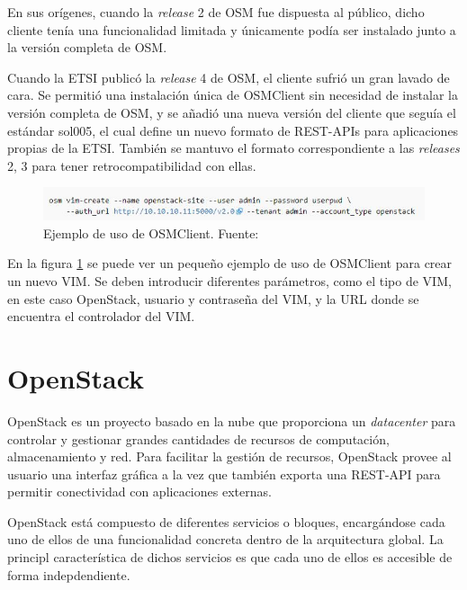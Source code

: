 En sus orígenes, cuando la \textit{release} 2 de \ac{OSM} fue dispuesta al público, dicho cliente tenía una funcionalidad limitada y únicamente podía ser instalado junto a la versión completa de \ac{OSM}.

Cuando la \ac{ETSI} publicó la \textit{release} 4 de \ac{OSM}, el cliente sufrió un gran lavado de cara. Se permitió una instalación única de OSMClient sin necesidad de instalar la versión completa de \ac{OSM}, y se añadió una nueva versión del cliente que seguía el estándar sol005\cite{sol005item}, el cual define un nuevo formato de REST-\acp{API} para aplicaciones propias de la \ac{ETSI}. También se mantuvo el formato correspondiente a las \textit{releases} 2, 3 para tener retrocompatibilidad con ellas.

\begin{figure}[!ht]
	\centering
	\includegraphics[width=0.95\linewidth]{imagenes/osmclientpython_example}
	\caption{Ejemplo de uso de OSMClient. Fuente:\cite{osmrel5bib}}
	\label{fig:osmclientpythonexample}
\end{figure}

En la figura \ref{fig:osmclientpythonexample} se puede ver un pequeño ejemplo de uso de OSMClient para crear un nuevo \ac{VIM}. Se deben introducir diferentes parámetros, como el tipo de \ac{VIM}, en este caso OpenStack, usuario y contraseña del \ac{VIM}, y la \ac{URL} donde se encuentra el controlador del \ac{VIM}.

\section{OpenStack}
\label{sec:openstack}

OpenStack\cite{openstackbib} es un proyecto basado en la nube que proporciona un \textit{datacenter} para controlar y gestionar grandes cantidades de recursos de computación, almacenamiento y red. Para facilitar la gestión de recursos, OpenStack provee al usuario una interfaz gráfica a la vez que también exporta una \ac{REST}-\ac{API} para permitir conectividad con aplicaciones externas.

OpenStack está compuesto de diferentes servicios o bloques, encargándose cada uno de ellos de una funcionalidad concreta dentro de la arquitectura global. La principl característica de dichos servicios es que cada uno de ellos es accesible de forma indepdendiente.

